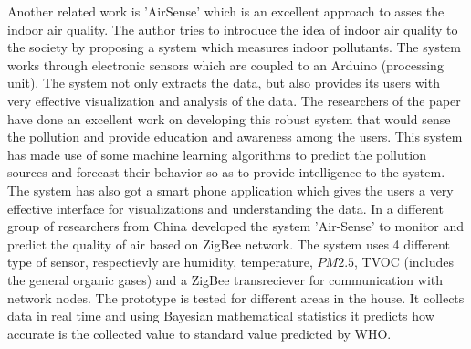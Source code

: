  Another related work is 'AirSense'\cite{Fang2016} which is an excellent approach to asses the indoor air quality. The author tries to introduce the idea of indoor air quality to the society by proposing a system which measures indoor pollutants. The system works through electronic sensors which are coupled to an Arduino (processing unit). The system not only extracts the data, but also provides its users with very effective visualization and analysis of the data. The researchers of the paper have done an excellent work on developing this robust system that would sense the pollution and provide education and awareness among the users. This system has made use of some machine learning algorithms to predict the pollution sources and forecast their behavior so as to provide intelligence to the system. 
The system has also got a smart phone application which gives the users a very effective interface for visualizations and understanding the data. In \cite{Liu2017} a different group of researchers from China developed the system 'Air-Sense' to monitor and predict the quality of air based on ZigBee network. The system uses 4 different type of sensor, respectievly are humidity, temperature, $PM2.5$, TVOC (includes the general organic gases) and a ZigBee transreciever for communication with network nodes. The prototype is tested for different areas in the house. It collects data in real time and using Bayesian mathematical statistics it predicts how accurate is the collected value to standard value predicted by WHO. 

